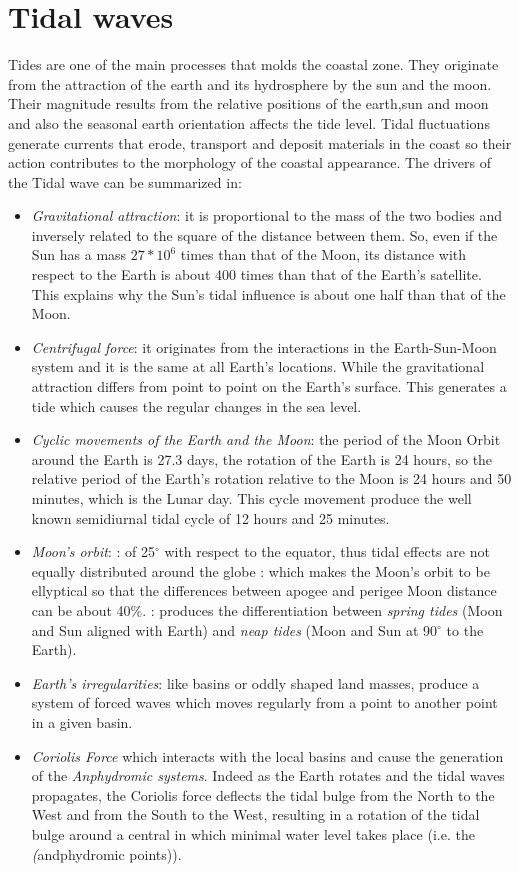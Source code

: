 \section{Tidal waves}\label{Tide}
Tides are one of the main processes that molds the coastal zone. They originate from the attraction of the earth and its hydrosphere by the sun and the moon. Their magnitude results from the relative positions of the earth,sun and moon and also the seasonal earth orientation affects the tide level. Tidal fluctuations generate currents that erode, transport and deposit materials in the coast so their action contributes to the morphology of the coastal appearance. The drivers of the Tidal wave can be summarized in:
\begin{itemize}
\item{\textit{Gravitational attraction}}: it is proportional to the mass of the two bodies and inversely related to the square of the distance between them. So, even if the Sun has a mass $27 * 10^6$ times than that of the Moon, its distance with respect to the Earth is about 400 times than that of the Earth's satellite. This explains why the Sun's tidal influence is about one half than that of the Moon.
\item{\textit{Centrifugal force}}: it originates from the interactions in the Earth-Sun-Moon system and it is the same at all Earth's locations. While the gravitational attraction differs from point to point on the Earth's surface. This generates a tide which causes the regular changes in the sea level. 
\item{\textit{Cyclic movements of the Earth and the Moon}}: the period of the Moon Orbit around the Earth is 27.3 days, the rotation of the Earth is 24 hours, so the relative period of the Earth's rotation relative to the Moon is 24 hours and 50 minutes, which is the Lunar day. This cycle movement produce the well known semidiurnal tidal cycle of 12 hours and 25 minutes. 
\item{\textit{Moon's orbit}}:
: of 25$^\circ$ with respect to the equator, thus tidal effects are not equally distributed around the globe
: which makes the Moon's orbit to be ellyptical so that the differences between apogee and perigee Moon distance can be about 40$\%$. 
: produces the differentiation between \textit{spring tides} (Moon and Sun aligned with Earth) and \textit{neap tides} (Moon and Sun at 90$^\circ$ to the Earth). 
\item{\textit{Earth's irregularities}}: like basins or oddly shaped land masses, produce a system of forced waves which moves regularly from a point to another point in a given basin.
\item{\textit{Coriolis Force}} which interacts with the local basins and cause the generation of the \textit{Anphydromic systems}. Indeed as the Earth rotates and the tidal waves propagates, the Coriolis force deflects the tidal bulge from the North to the West and from the South to the West, resulting in a rotation of the tidal bulge around a central in which minimal water level takes place (i.e. the \textit(andphydromic points)).  
\end{itemize}

